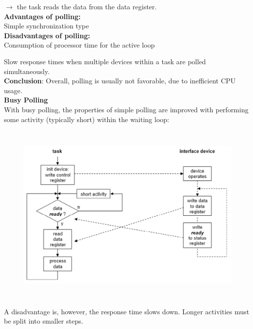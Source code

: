 $\rightarrow$ the task reads the data from the data register.\\

\textbf{Advantages of polling:}\\

\hspace{1cm} Simple synchronization type\\

\textbf{Disadvantages of polling:}\\

\hspace{1cm} Consumption of processor time for the active loop

\hspace{1cm} Slow response times when multiple devices within a task are polled simultaneously.\\

\textbf{Conclusion}: Overall, polling is usually not favorable, due to inefficient CPU usage.\\
\newpage
{\rot\bf Busy Polling}\\

With busy polling, the properties of simple polling are improved with performing some activity (typically short) within the waiting loop:

 	\begin{figure}[h]
    \centering
    \includegraphics[width=14cm, height=9cm]{Images/image124.png}
    \label{fig:Fig 73}
    \end{figure}

A disadvantage is, however, the response time slows down. Longer activities must be split into smaller steps.\\

